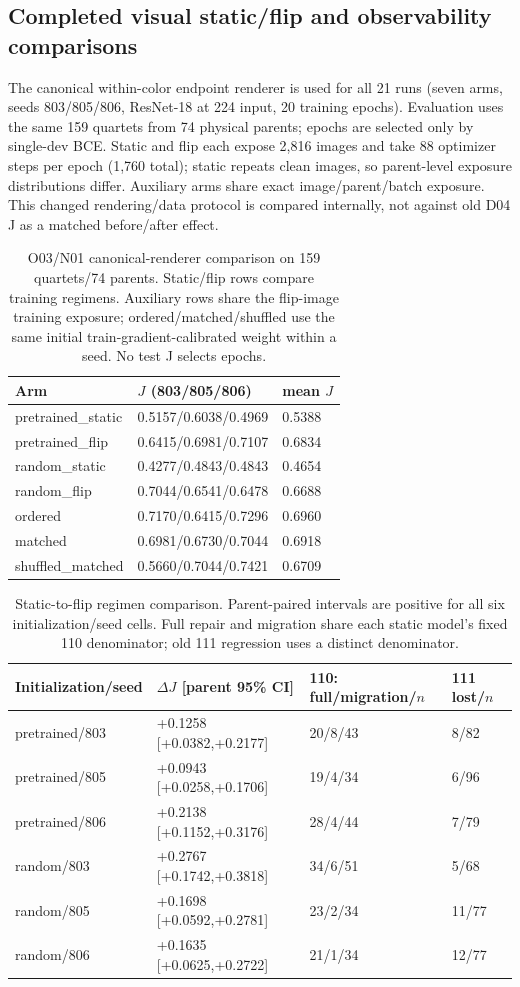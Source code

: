 \subsection{Completed visual static/flip and observability comparisons}
The canonical within-color endpoint renderer is used for all 21 runs (seven arms, seeds 803/805/806, ResNet-18 at 224 input, 20 training epochs). Evaluation uses the same 159 quartets from 74 physical parents; epochs are selected only by single-dev BCE. Static and flip each expose 2,816 images and take 88 optimizer steps per epoch (1,760 total); static repeats clean images, so parent-level exposure distributions differ. Auxiliary arms share exact image/parent/batch exposure. This changed rendering/data protocol is compared internally, not against old D04 J as a matched before/after effect.
\begin{table}[t]\centering\small\begin{tabular}{@{}lll@{}}\toprule
Arm & $J$ (803/805/806) & mean $J$ \\
\midrule
pretrained\_static & 0.5157/0.6038/0.4969 & 0.5388 \\
pretrained\_flip & 0.6415/0.6981/0.7107 & 0.6834 \\
random\_static & 0.4277/0.4843/0.4843 & 0.4654 \\
random\_flip & 0.7044/0.6541/0.6478 & 0.6688 \\
ordered & 0.7170/0.6415/0.7296 & 0.6960 \\
matched & 0.6981/0.6730/0.7044 & 0.6918 \\
shuffled\_matched & 0.5660/0.7044/0.7421 & 0.6709 \\
\bottomrule\end{tabular}\caption{O03/N01 canonical-renderer comparison on 159 quartets/74 parents. Static/flip rows compare training regimens. Auxiliary rows share the flip-image training exposure; ordered/matched/shuffled use the same initial train-gradient-calibrated weight within a seed. No test J selects epochs.}\end{table}
\begin{table}[t]\centering\small\begin{tabular}{@{}llll@{}}\toprule
Initialization/seed & $\Delta J$ [parent 95\% CI] & 110: full/migration/$n$ & 111 lost/$n$ \\
\midrule
pretrained/803 & +0.1258 [+0.0382,+0.2177] & 20/8/43 & 8/82 \\
pretrained/805 & +0.0943 [+0.0258,+0.1706] & 19/4/34 & 6/96 \\
pretrained/806 & +0.2138 [+0.1152,+0.3176] & 28/4/44 & 7/79 \\
random/803 & +0.2767 [+0.1742,+0.3818] & 34/6/51 & 5/68 \\
random/805 & +0.1698 [+0.0592,+0.2781] & 23/2/34 & 11/77 \\
random/806 & +0.1635 [+0.0625,+0.2722] & 21/1/34 & 12/77 \\
\bottomrule\end{tabular}\caption{Static-to-flip regimen comparison. Parent-paired intervals are positive for all six initialization/seed cells. Full repair and migration share each static model's fixed 110 denominator; old 111 regression uses a distinct denominator.}\end{table}
